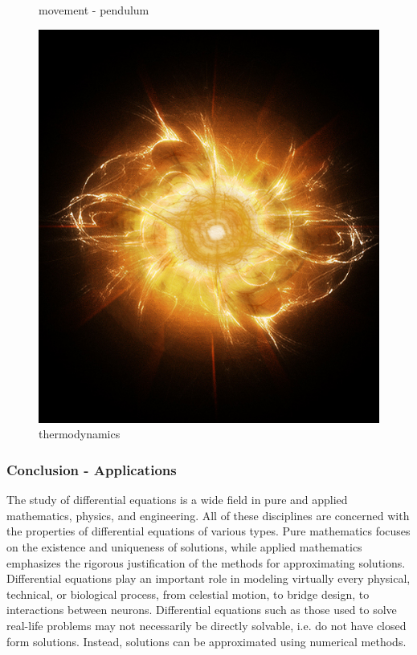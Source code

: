 \documentclass{beamer}
\begin{document}
\begin{frame}[allowframebreaks]
\begin{figure}
\begin{minipage}{.45\textwidth}
      \caption{movement - pendulum}
    \end{minipage}
    \begin{minipage}{.45\textwidth}
      \includegraphics[width=\linewidth]{thermodynamics}
      \caption{thermodynamics}
    \end{minipage}
  \end{figure}
\end{frame}

\begin{frame}
\frametitle {Conclusion - Applications}
  The study of differential equations is a wide field in pure and applied mathematics, physics, and engineering. All of these disciplines are concerned with the properties of differential equations of various types. 
  Pure mathematics focuses on the existence and uniqueness of solutions, while applied mathematics emphasizes the rigorous justification of the methods for approximating solutions. 
  Differential equations play an important role in modeling virtually every physical, technical, or biological process, from celestial motion, to bridge design, to interactions between neurons. 
  Differential equations such as those used to solve real-life problems may not necessarily be directly solvable, i.e. do not have closed form solutions. Instead, solutions can be approximated using numerical methods.
\end{frame}
\end{document}
